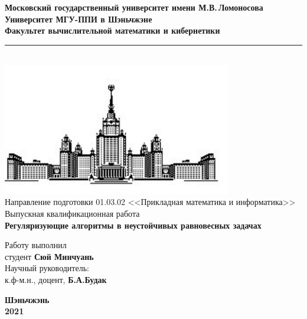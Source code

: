 
\begin{titlepage}
	\begin{spacing}{1.0}
	\begin{center}
		\textbf{Московский государственный университет имени М.В.\,Ломоносова}\\
		\textbf{\small Университет МГУ-ППИ в Шэньчжэне}\\
		\textbf{\small Факультет вычислительной математики и кибернетики}
		\rule[-10pt]{15cm}{0.05em}\\[1mm]
		\includegraphics[width=100mm]{./images/MSU-BIT}\\[13mm]
		{ Направление подготовки 01.03.02 <<Прикладная математика и информатика>>}\\[13mm]
		{ Выпускная квалификационная работа}\\[3mm]
	    \textbf{\Large\bfseries Регуляризующие алгоритмы в
	    	неустойчивых равновесных задачах}\\[15mm]
    

	    \begin{flushright}
	            \small Работу выполнил\\
	           \small студент \textbf{Сюй Минчуань}\\[10mm]
	            
	            \small Научный руководитель:\\
	            \small к.ф-м.н., доцент, \textbf{Б.А.Будак}%
	            
	    \end{flushright}

	    \vspace{\fill}
	    \textbf{Шэньчжэнь}\\\textbf{2021}
	\end{center}
	\end{spacing}
\end{titlepage}

\clearpage
